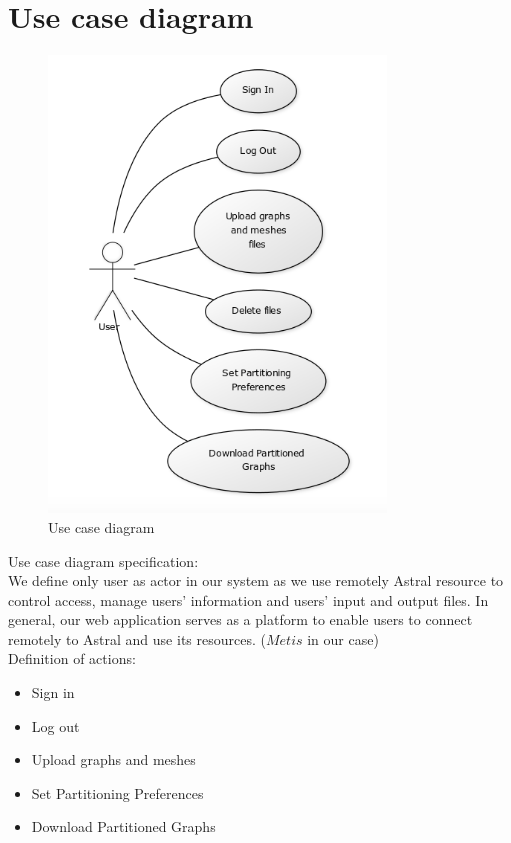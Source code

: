 \documentclass{cranfieldChart}
\begin{document}
\section{Use case diagram}
\begin{figure}[h]
\centering
\includegraphics[width=0.8\textwidth]{ressources/use-case}
\caption{Use case diagram}
\end{figure}
Use case diagram specification: \\
We define only user as actor in our system as we use remotely Astral resource to control access, manage users' information and users' input and output files. In general, our web application serves as a platform to enable users to connect remotely to Astral and use its resources. ($Metis$ in our case) \\
Definition of actions: 
\begin{itemize}
    \item Sign in 
    \item Log out
    \item Upload graphs and meshes
    \item Set Partitioning Preferences 
    \item Download Partitioned Graphs 
\end{itemize}
\end{document}
